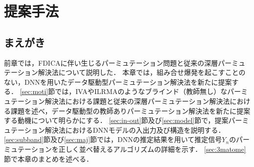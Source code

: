 
\chapter{提案手法}
\label{chap:proposed}

\section{まえがき}
前章では，FDICAに伴い生じるパーミュテーション問題と従来の深層パーミュテーション解決法について説明した．
本章では，組み合せ爆発を起こすことのない，DNNを用いたデータ駆動型パーミュテーション解決法を新たに提案する．
\ref{sec:moti}節では，IVAやILRMAのようなブラインド（教師無し）なパーミュテーション解決法における課題と従来の深層パーミュテーション解決法における課題を述べ，データ駆動型の教師ありパーミュテーション解決法を新たに提案する動機について明らかにする．
\ref{sec:in-out}節及び\ref{sec:model}節で，提案パーミュテーション解決法におけるDNNモデルの入出力及び構造を説明する．
\ref{sec:subband}節及び\ref{sec:maj}節では，DNNの推定結果を用いて推定信号$Y_n$のパーミュテーションを正しく並べ替えるアルゴリズムの詳細を示す．
\ref{sec:3matome}節で本章のまとめを述べる．

